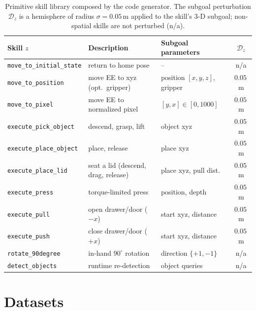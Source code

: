 \documentclass{article}
\begin{document}
\begin{table}[h]
\centering
\caption{Primitive skill library composed by the code generator. The subgoal
perturbation $\mathcal{D}_z$ is a hemisphere of radius $\sigma{=}0.05$\,m applied
to the skill's $3$-D subgoal; non-spatial skills are not perturbed (n/a).}
\label{tab:skills}
\small
\setlength{\tabcolsep}{5pt}
\begin{tabular}{lllc}
\toprule
\textbf{Skill $z$} & \textbf{Description} & \textbf{Subgoal parameters} & \textbf{$\mathcal{D}_z$} \\
\midrule
\texttt{move\_to\_initial\_state} & return to home pose                 & --                        & n/a \\
\texttt{move\_to\_position}       & move EE to xyz (opt.\ gripper)      & position $[x,y,z]$, gripper & $0.05$\,m \\
\texttt{move\_to\_pixel}          & move EE to normalized pixel         & $[y,x]\in[0,1000]$        & $0.05$\,m \\
\texttt{execute\_pick\_object}    & descend, grasp, lift                & object xyz                & $0.05$\,m \\
\texttt{execute\_place\_object}   & place, release                      & place xyz                 & $0.05$\,m \\
\texttt{execute\_place\_lid}      & seat a lid (descend, drag, release) & place xyz, pull dist.\    & $0.05$\,m \\
\texttt{execute\_press}           & torque-limited press                & position, depth           & $0.05$\,m \\
\texttt{execute\_pull}            & open drawer/door ($-x$)             & start xyz, distance       & $0.05$\,m \\
\texttt{execute\_push}            & close drawer/door ($+x$)            & start xyz, distance       & $0.05$\,m \\
\texttt{rotate\_90degree}         & in-hand $90^\circ$ rotation         & direction $\{+1,-1\}$     & n/a \\
\texttt{detect\_objects}          & runtime re-detection                & object queries            & n/a \\
\bottomrule
\end{tabular}
\end{table}

\section{Datasets}
\label{app:datasets}
\end{document}
